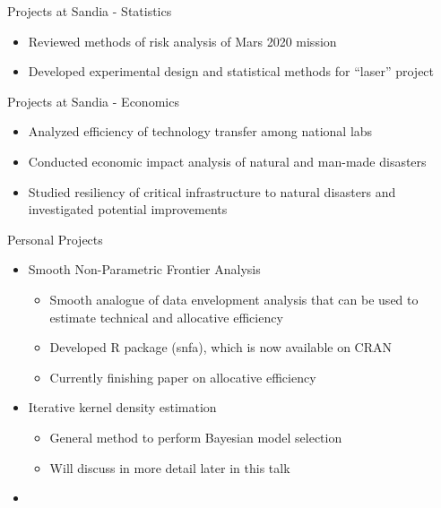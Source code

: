 \documentclass{beamer}
\begin{document}
\begin{frame}{Projects at Sandia - Statistics}
\begin{itemize}
	\item Reviewed methods of risk analysis of Mars 2020 mission
	\item Developed experimental design and statistical methods for ``laser'' project
\end{itemize}
\end{frame}

\begin{frame}{Projects at Sandia - Economics}
\begin{itemize}
	\item Analyzed efficiency of technology transfer among national labs
	\item Conducted economic impact analysis of natural and man-made disasters
	\item Studied resiliency of critical infrastructure to natural disasters and investigated potential improvements
\end{itemize}
\end{frame}

\begin{frame}{Personal Projects}
\begin{itemize}
	\item Smooth Non-Parametric Frontier Analysis
		\begin{itemize}
			\item Smooth analogue of data envelopment analysis that can be used to estimate technical and allocative efficiency
			\item Developed R package (snfa), which is now available on CRAN
			\item Currently finishing paper on allocative efficiency
		\end{itemize}
	\item Iterative kernel density estimation
		\begin{itemize}
			\item General method to perform Bayesian model selection
			\item Will discuss in more detail later in this talk
		\end{itemize}
\end{itemize}
\end{frame}

\begin{frame}
\begin{itemize}
	\item 
\end{itemize}
\end{frame}
\end{document}

